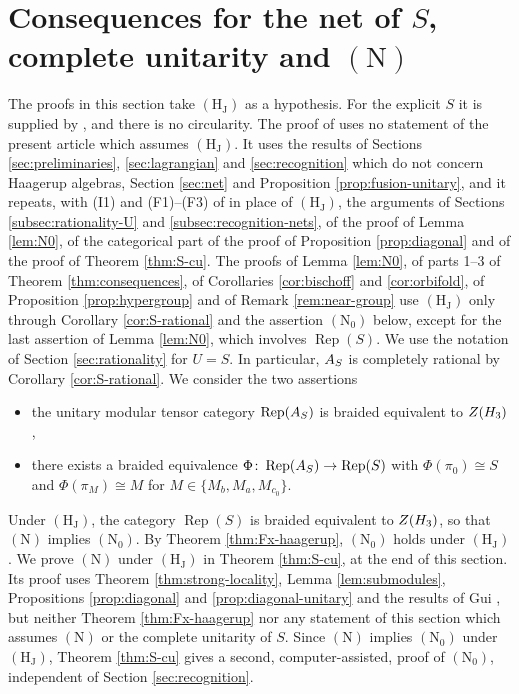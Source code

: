 \documentclass[leqno]{article}
\let\cal\relax
\newcommand{\cal}{\mathcal}
\newcommand{\co}{\colon}
\DeclareMathOperator{\Rep}{Rep} %
\numberwithin{equation}{section}
\begin{document}
\section{Consequences for the net of \texorpdfstring{$S$}{S}, complete unitarity and \texorpdfstring{$\mathrm{(N)}$}{(N)}}
\label{sec:N}

The proofs in this section take $\mathrm{(H_J)}$ as a hypothesis. For the explicit $S$ it is supplied by \cite[Theorem 6.1]{ArhIII}, and there is no circularity. The proof of \cite[Theorem 6.1]{ArhIII} uses no statement of the present article which assumes $\mathrm{(H_J)}$. It uses the results of Sections \ref{sec:preliminaries}, \ref{sec:lagrangian} and \ref{sec:recognition} which do not concern Haagerup algebras, Section \ref{sec:net} and Proposition \ref{prop:fusion-unitary}, and it repeats, with \textup{(I1)} and \textup{(F1)}--\textup{(F3)} of \cite[Theorems 2.1 and 2.2]{ArhIII} in place of $\mathrm{(H_J)}$, the arguments of Sections \ref{subsec:rationality-U} and \ref{subsec:recognition-nets}, of the proof of Lemma \ref{lem:N0}, of the categorical part of the proof of Proposition \ref{prop:diagonal} and of the proof of Theorem \ref{thm:S-cu}. The proofs of Lemma \ref{lem:N0}, of parts 1--3 of Theorem \ref{thm:consequences}, of Corollaries \ref{cor:bischoff} and \ref{cor:orbifold}, of Proposition \ref{prop:hypergroup} and of Remark \ref{rem:near-group} use $\mathrm{(H_J)}$ only through Corollary \ref{cor:S-rational} and the assertion $\mathrm{(N_0)}$ below, except for the last assertion of Lemma \ref{lem:N0}, which involves $\Rep(S)$. We use the notation of Section \ref{sec:rationality} for $U = S$. In particular, $\cal A_S$ is completely rational by Corollary \ref{cor:S-rational}. We consider the two assertions
\begin{itemize}
\item[$\mathrm{(N_0)}$] the unitary modular tensor category $\Rep(\cal A_S)$ is braided equivalent to $Z(\cal H_3)$,
\item[$\mathrm{(N)}$] there exists a braided equivalence $\Phi \co \Rep(\cal A_S) \to \Rep(S)$ with $\Phi(\pi_0) \cong S$ and $\Phi(\pi_M) \cong M$ for $M \in \{M_b,M_a,M_{c_0}\}$.
\end{itemize}
Under $\mathrm{(H_J)}$, the category $\Rep(S)$ is braided equivalent to $Z(\cal H_3)$, so that $\mathrm{(N)}$ implies $\mathrm{(N_0)}$. By Theorem \ref{thm:Fx-haagerup}, $\mathrm{(N_0)}$ holds under $\mathrm{(H_J)}$. We prove $\mathrm{(N)}$ under $\mathrm{(H_J)}$ in Theorem \ref{thm:S-cu}, at the end of this section. Its proof uses Theorem \ref{thm:strong-locality}, Lemma \ref{lem:submodules}, Propositions \ref{prop:diagonal} and \ref{prop:diagonal-unitary} and the results of Gui \cite{Gui26,Gui25}, but neither Theorem \ref{thm:Fx-haagerup} nor any statement of this section which assumes $\mathrm{(N)}$ or the complete unitarity of $S$. Since $\mathrm{(N)}$ implies $\mathrm{(N_0)}$ under $\mathrm{(H_J)}$, Theorem \ref{thm:S-cu} gives a second, computer-assisted, proof of $\mathrm{(N_0)}$, independent of Section \ref{sec:recognition}.
\end{document}
